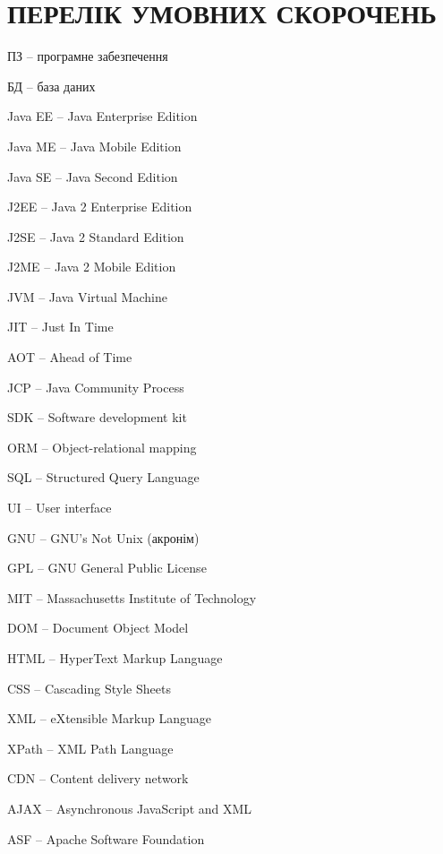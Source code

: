






\setcounter{page}{6}
\tableofcontents

\section*{ПЕРЕЛІК УМОВНИХ СКОРОЧЕНЬ}
\par ПЗ -- програмне забезпечення
\par БД -- база даних
\par Java EE -- Java Enterprise Edition
\par Java ME -- Java Mobile Edition
\par Java SE -- Java Second Edition
\par J2EE -- Java 2 Enterprise Edition
\par J2SE -- Java 2 Standard Edition
\par J2ME -- Java 2 Mobile Edition
\par JVM -- Java Virtual Machine
\par JIT -- Just In Time
\par AOT -- Ahead of Time
\par JCP -- Java Community Process
\par SDK -- Software development kit 
\par ORM -- Object-relational mapping
\par SQL -- Structured Query Language
\par UI -- User interface
\par GNU -- GNU's Not Unix (акронім)
\par GPL -- GNU General Public License
\par MIT -- Massachusetts Institute of Technology
\par DOM -- Document Object Model
\par HTML -- HyperText Markup Language
\par CSS -- Cascading Style Sheets
\par XML -- eXtensible Markup Language
\par XPath -- XML Path Language
\par CDN -- Content delivery network
\par AJAX --  Asynchronous JavaScript and XML
\par ASF -- Apache Software Foundation 

